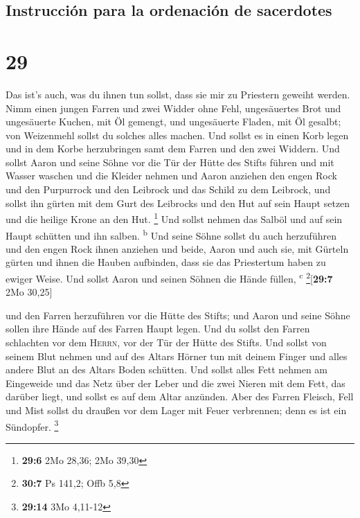 \hypertarget{instrucciuxf3n-para-la-ordenaciuxf3n-de-sacerdotes}{%
\subsection{Instrucción para la ordenación de
sacerdotes}\label{instrucciuxf3n-para-la-ordenaciuxf3n-de-sacerdotes}}

\hypertarget{section-28}{%
\section{29}\label{section-28}}

 Das ist's auch, was du ihnen tun sollst, dass sie mir zu
Priestern geweiht werden. Nimm einen jungen Farren und zwei Widder ohne
Fehl,  ungesäuertes Brot und ungesäuerte Kuchen, mit Öl
gemengt, und ungesäuerte Fladen, mit Öl gesalbt; von Weizenmehl sollst
du solches alles machen.  Und sollst es in einen Korb
legen und in dem Korbe herzubringen samt dem Farren und den zwei
Widdern.  Und sollst Aaron und seine Söhne vor die Tür der
Hütte des Stifts führen und mit Wasser waschen  und die
Kleider nehmen und Aaron anziehen den engen Rock und den Purpurrock und
den Leibrock und das Schild zu dem Leibrock, und sollst ihn gürten mit
dem Gurt des Leibrocks  und den Hut auf sein Haupt setzen
und die heilige Krone an den Hut. \footnote{\textbf{29:6} 2Mo 28,36; 2Mo
  39,30}  Und sollst nehmen das Salböl und auf sein Haupt
schütten und ihn salben. \textsuperscript{b}  Und seine
Söhne sollst du auch herzuführen und den engen Rock ihnen anziehen
 und beide, Aaron und auch sie, mit Gürteln gürten und
ihnen die Hauben aufbinden, dass sie das Priestertum haben zu ewiger
Weise. Und sollst Aaron und seinen Söhnen die Hände füllen,
\textsuperscript{c} \footnote{\textbf{30:7} Ps 141,2; Offb 5,8}{[}\textbf{29:7}
2Mo 30,25{]}

 und den Farren herzuführen vor die Hütte des Stifts; und
Aaron und seine Söhne sollen ihre Hände auf des Farren Haupt legen.
 Und du sollst den Farren schlachten vor dem
\textsc{Herrn}, vor der Tür der Hütte des Stifts.  Und
sollst von seinem Blut nehmen und auf des Altars Hörner tun mit deinem
Finger und alles andere Blut an des Altars Boden schütten.
 Und sollst alles Fett nehmen am Eingeweide und das Netz
über der Leber und die zwei Nieren mit dem Fett, das darüber liegt, und
sollst es auf dem Altar anzünden.  Aber des Farren
Fleisch, Fell und Mist sollst du draußen vor dem Lager mit Feuer
verbrennen; denn es ist ein Sündopfer. \footnote{\textbf{29:14} 3Mo
  4,11-12}

